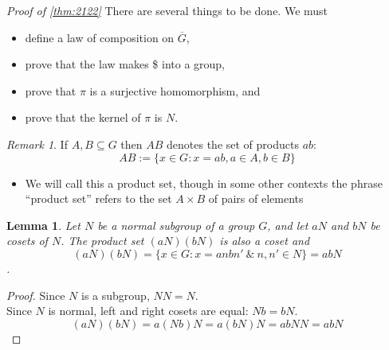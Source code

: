 \documentclass[
]{book}
\providecommand{\tightlist}{%
  \setlength{\itemsep}{0pt}\setlength{\parskip}{0pt}}
\newtheorem{lemma}{Lemma}[chapter]
\theoremstyle{definition}
\theoremstyle{definition}
\theoremstyle{definition}
\theoremstyle{definition}
\theoremstyle{remark}
\newtheorem*{remark}{Remark}
\begin{document}
\emph{Proof of \ref{thm:2122}}
There are several things to be done. We must

\begin{itemize}
\tightlist
\item
  define a law of composition on \(\overline{G}\),
\item
  prove that the law makes \$ into a group,
\item
  prove that \(\pi\) is a surjective homomorphism, and
\item
  prove that the kernel of \(\pi\) is \(N\).
\end{itemize}

\begin{remark}

If \(A,B \subseteq G\) then \(AB\) denotes the set of products \(ab\):
\[AB:=\{x\in G: x=ab, a\in A, b\in B\}\]

\begin{itemize}
\tightlist
\item
  We will call this a product set, though in some other contexts the phrase ``product set'' refers
  to the set \(A \times B\) of pairs of elements
\end{itemize}

\end{remark}

\begin{lemma}
\protect\hypertarget{lem:unnamed-chunk-42}{}\label{lem:unnamed-chunk-42}Let \(N\) be a normal subgroup of a group \(G\), and let \(a N\) and \(b N\) be cosets of \(N\). The product set \((aN )(bN )\) is also a coset and \[(aN )(bN )=\{x\in G: x=anbn' ~\& ~ n,n'\in N\}=abN\].
\end{lemma}

\begin{proof}
Since \(N\) is a subgroup, \(N N = N\).\\
Since \(N\) is normal, left and right cosets are equal:
\(N b = bN\).
\[(aN )(bN ) = a (N b )N = a (b N )N = a b N N = abN\]
\end{proof}
\end{document}
